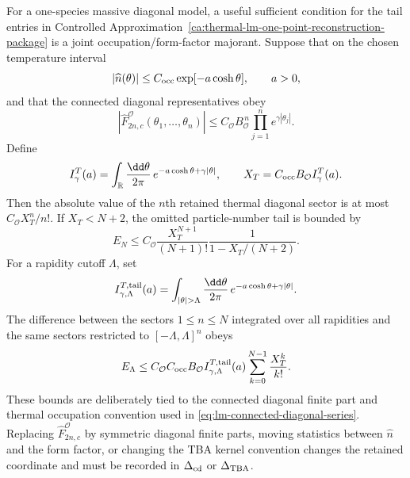 \begin{controlledapproximation}
\label{ca:thermal-lm-convergence-window}
For a one-species massive diagonal model, a useful sufficient condition for the
tail entries in
Controlled Approximation~\ref{ca:thermal-lm-one-point-reconstruction-package}
is a joint occupation/form-factor majorant.  Suppose that on the chosen
temperature interval
\begin{equation}
  |\widehat n(\theta)|
  \le
  C_{\rm occ}\exp[-a\cosh\theta],
  \qquad a>0,
  \label{eq:thermal-lm-occupation-majorant}
\end{equation}
and that the connected diagonal representatives obey
\begin{equation}
  \left|
  \widehat F^{\mathcal O}_{2n,c}(\theta_1,\ldots,\theta_n)
  \right|
  \le
  C_{\mathcal O} B_{\mathcal O}^{\,n}
  \prod_{j=1}^n e^{\gamma|\theta_j|}.
  \label{eq:thermal-lm-connected-diagonal-majorant}
\end{equation}
Define
\begin{equation}
  I_\gamma^T(a)
  =
  \int_{\mathbb R}
  \frac{\dd\theta}{2\pi}\,
  e^{-a\cosh\theta+\gamma|\theta|},
  \qquad
  X_T=C_{\rm occ}B_{\mathcal O}I_\gamma^T(a).
  \label{eq:thermal-lm-one-particle-majorant}
\end{equation}
Then the absolute value of the \(n\)th retained thermal diagonal sector is at
most \(C_{\mathcal O}X_T^n/n!\).  If \(X_T<N+2\), the omitted
particle-number tail is bounded by
\begin{equation}
  E_N
  \le
  C_{\mathcal O}
  \frac{X_T^{N+1}}{(N+1)!}
  \frac{1}{1-X_T/(N+2)}.
  \label{eq:thermal-lm-particle-tail-bound}
\end{equation}
For a rapidity cutoff \(\Lambda\), set
\begin{equation}
  I_{\gamma,\Lambda}^{T,{\rm tail}}(a)
  =
  \int_{|\theta|>\Lambda}
  \frac{\dd\theta}{2\pi}\,
  e^{-a\cosh\theta+\gamma|\theta|}.
  \label{eq:thermal-lm-rapidity-tail-integral}
\end{equation}
The difference between the sectors \(1\le n\le N\) integrated over all
rapidities and the same sectors restricted to \([-\Lambda,\Lambda]^n\) obeys
\begin{equation}
  E_\Lambda
  \le
  C_{\mathcal O}C_{\rm occ}B_{\mathcal O}
  I_{\gamma,\Lambda}^{T,{\rm tail}}(a)
  \sum_{k=0}^{N-1}\frac{X_T^k}{k!}.
  \label{eq:thermal-lm-rapidity-cut-bound}
\end{equation}
These bounds are deliberately tied to the connected diagonal finite part and
thermal occupation convention used in
\eqref{eq:lm-connected-diagonal-series}.  Replacing
\(\widehat F_{2n,c}^{\mathcal O}\) by symmetric diagonal finite parts, moving
statistics between \(\widehat n\) and the form factor, or changing the TBA
kernel convention changes the retained coordinate and must be recorded in
\(\Delta_{\rm cd}\) or \(\Delta_{\rm TBA}\).
\end{controlledapproximation}

